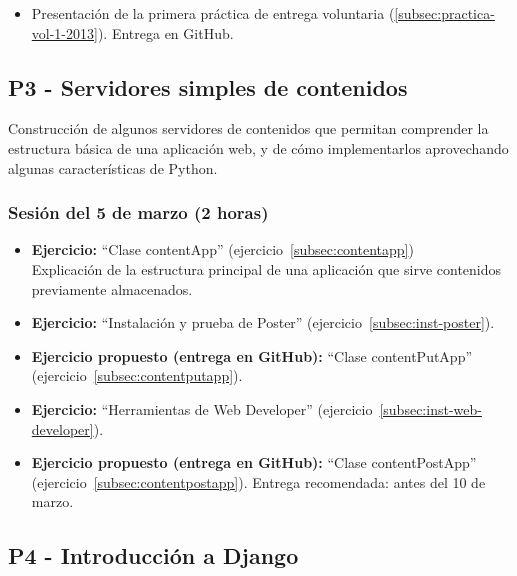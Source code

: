 \documentclass[a4paper,12pt]{article}
\begin{document}
\begin{itemize}
\item Presentación de la primera práctica de entrega voluntaria (\ref{subsec:practica-vol-1-2013}). Entrega en GitHub.
\end{itemize}

\subsection{P3 - Servidores simples de contenidos}

Construcción de algunos servidores de contenidos que permitan comprender la estructura básica de una aplicación web, y de cómo implementarlos aprovechando algunas características de Python.

\subsubsection{Sesión del 5 de marzo (2 horas)}

\begin{itemize}
 \item \textbf{Ejercicio:}  ``Clase contentApp'' (ejercicio~\ref{subsec:contentapp}) \\
   Explicación de la estructura principal de una aplicación que sirve contenidos previamente almacenados.
 \item \textbf{Ejercicio:} ``Instalación y prueba de Poster'' (ejercicio~\ref{subsec:inst-poster}).
 \item \textbf{Ejercicio propuesto (entrega en GitHub):} ``Clase contentPutApp'' (ejercicio~\ref{subsec:contentputapp}).  
 \item \textbf{Ejercicio:} ``Herramientas de Web Developer'' (ejercicio~\ref{subsec:inst-web-developer}).
 \item \textbf{Ejercicio propuesto (entrega en GitHub):} ``Clase contentPostApp'' (ejercicio~\ref{subsec:contentpostapp}).
   Entrega recomendada: antes del 10 de marzo.
\end{itemize}


\subsection{P4 - Introducción a Django}
\end{document}
